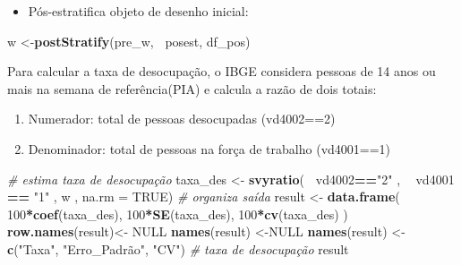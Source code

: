 \documentclass[]{book}
\newenvironment{Shaded}{\begin{snugshade}}{\end{snugshade}}
\newcommand{\KeywordTok}[1]{\textcolor[rgb]{0.13,0.29,0.53}{\textbf{#1}}}
\newcommand{\DataTypeTok}[1]{\textcolor[rgb]{0.13,0.29,0.53}{#1}}
\newcommand{\DecValTok}[1]{\textcolor[rgb]{0.00,0.00,0.81}{#1}}
\newcommand{\StringTok}[1]{\textcolor[rgb]{0.31,0.60,0.02}{#1}}
\newcommand{\CommentTok}[1]{\textcolor[rgb]{0.56,0.35,0.01}{\textit{#1}}}
\newcommand{\OtherTok}[1]{\textcolor[rgb]{0.56,0.35,0.01}{#1}}
\newcommand{\OperatorTok}[1]{\textcolor[rgb]{0.81,0.36,0.00}{\textbf{#1}}}
\newcommand{\NormalTok}[1]{#1}
\providecommand{\tightlist}{%
  \setlength{\itemsep}{0pt}\setlength{\parskip}{0pt}}
\theoremstyle{definition}
\theoremstyle{definition}
\theoremstyle{definition}
\theoremstyle{remark}
\begin{document}
\begin{Shaded}
\end{Shaded}

\begin{itemize}
\tightlist
\item
  Pós-estratifica objeto de desenho inicial:
\end{itemize}

\begin{Shaded}
\begin{Highlighting}[]
\NormalTok{w <-}\KeywordTok{postStratify}\NormalTok{(pre_w, }\OperatorTok{~}\NormalTok{posest, df_pos)}
\end{Highlighting}
\end{Shaded}

Para calcular a taxa de desocupação, o IBGE considera pessoas de 14 anos
ou mais na semana de referência(PIA) e calcula a razão de dois totais:

\begin{enumerate}
\def\labelenumi{\arabic{enumi}.}
\item
  Numerador: total de pessoas desocupadas (vd4002==2)
\item
  Denominador: total de pessoas na força de trabalho (vd4001==1)
\end{enumerate}

\begin{Shaded}
\begin{Highlighting}[]
\CommentTok{# estima taxa de desocupação}
\NormalTok{taxa_des <-}\StringTok{ }\KeywordTok{svyratio}\NormalTok{(}\OperatorTok{~}\StringTok{ }\NormalTok{vd4002}\OperatorTok{==}\StringTok{"2"}\NormalTok{ ,}
  \OperatorTok{~}\StringTok{ }\NormalTok{vd4001 }\OperatorTok{==}\StringTok{ "1"}\NormalTok{ , w , }\DataTypeTok{na.rm =} \OtherTok{TRUE}\NormalTok{)}
\CommentTok{# organiza saída}
\NormalTok{result <-}\StringTok{ }\KeywordTok{data.frame}\NormalTok{(}
  \DecValTok{100}\OperatorTok{*}\KeywordTok{coef}\NormalTok{(taxa_des),}
  \DecValTok{100}\OperatorTok{*}\KeywordTok{SE}\NormalTok{(taxa_des), }
  \DecValTok{100}\OperatorTok{*}\KeywordTok{cv}\NormalTok{(taxa_des)}
\NormalTok{)}
\KeywordTok{row.names}\NormalTok{(result)<-}\StringTok{ }\OtherTok{NULL}
\KeywordTok{names}\NormalTok{(result) <-}\OtherTok{NULL}
\KeywordTok{names}\NormalTok{(result) <-}\StringTok{ }\KeywordTok{c}\NormalTok{(}\StringTok{"Taxa"}\NormalTok{, }\StringTok{"Erro_Padrão"}\NormalTok{, }\StringTok{"CV"}\NormalTok{)}
\CommentTok{# taxa de desocupação}
\NormalTok{result}
\end{Highlighting}
\end{Shaded}
\end{document}
